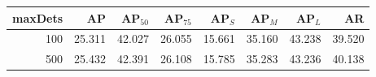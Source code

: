 \begin{tabular}{rrrrrrrr}
\toprule
maxDets & AP & AP$_{50}$ & AP$_{75}$ & AP$_S$ & AP$_M$ & AP$_L$ & AR\\
\midrule
100 & 25.311 & 42.027 & 26.055 & 15.661 & 35.160 & 43.238 & 39.520\\
500 & 25.432 & 42.391 & 26.108 & 15.785 & 35.283 & 43.236 & 40.138\\
\bottomrule
\end{tabular}
